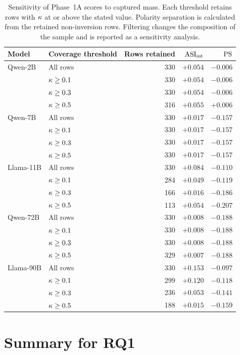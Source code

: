 \begin{table}[htbp]\centering\small
\begin{tabular}{@{}llrrr@{}}
\toprule
Model & Coverage threshold & Rows retained & $\mathrm{ASI}_{\mathrm{int}}$ & $\mathrm{PS}$ \\
\midrule
Qwen-2B & All rows & 330 & $+0.054$ & $-0.006$ \\
 & $\kappa\ge0.1$ & 330 & $+0.054$ & $-0.006$ \\
 & $\kappa\ge0.3$ & 330 & $+0.054$ & $-0.006$ \\
 & $\kappa\ge0.5$ & 316 & $+0.055$ & $+0.006$ \\
\addlinespace
Qwen-7B & All rows & 330 & $+0.017$ & $-0.157$ \\
 & $\kappa\ge0.1$ & 330 & $+0.017$ & $-0.157$ \\
 & $\kappa\ge0.3$ & 330 & $+0.017$ & $-0.157$ \\
 & $\kappa\ge0.5$ & 330 & $+0.017$ & $-0.157$ \\
\addlinespace
Llama-11B & All rows & 330 & $+0.084$ & $-0.110$ \\
 & $\kappa\ge0.1$ & 284 & $+0.049$ & $-0.119$ \\
 & $\kappa\ge0.3$ & 166 & $+0.016$ & $-0.186$ \\
 & $\kappa\ge0.5$ & 113 & $+0.054$ & $-0.207$ \\
\addlinespace
Qwen-72B & All rows & 330 & $+0.008$ & $-0.188$ \\
 & $\kappa\ge0.1$ & 330 & $+0.008$ & $-0.188$ \\
 & $\kappa\ge0.3$ & 330 & $+0.008$ & $-0.188$ \\
 & $\kappa\ge0.5$ & 329 & $+0.007$ & $-0.188$ \\
\addlinespace
Llama-90B & All rows & 330 & $+0.153$ & $-0.097$ \\
 & $\kappa\ge0.1$ & 299 & $+0.120$ & $-0.118$ \\
 & $\kappa\ge0.3$ & 236 & $+0.053$ & $-0.141$ \\
 & $\kappa\ge0.5$ & 188 & $+0.015$ & $-0.159$ \\
\bottomrule
\end{tabular}
\caption{Sensitivity of Phase~1A scores to captured mass. Each threshold
retains rows with $\kappa$ at or above the stated value. Polarity separation
is calculated from the retained non-inversion rows. Filtering changes the
composition of the sample and is reported as a sensitivity analysis.}
\label{tab:s1-capmfilter}
\end{table}

\section{Summary for RQ1}\label{sec:s1-summary}

